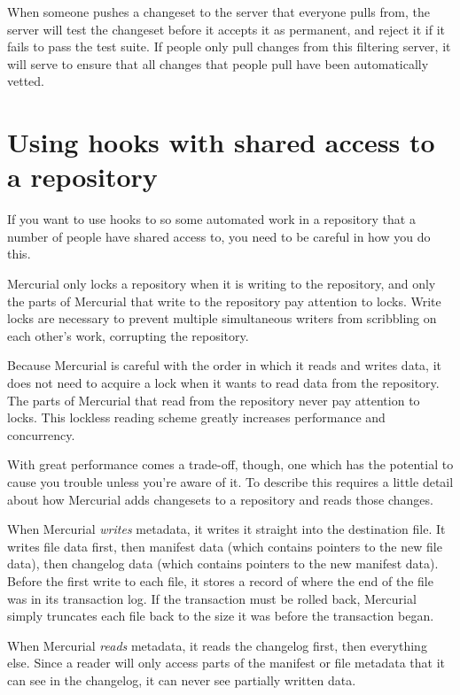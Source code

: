 When someone pushes a changeset to the server that everyone pulls
from, the server will test the changeset before it accepts it as
permanent, and reject it if it fails to pass the test suite.  If
people only pull changes from this filtering server, it will serve to
ensure that all changes that people pull have been automatically
vetted.

\section{Using hooks with shared access to a repository}

If you want to use hooks to so some automated work in a repository
that a number of people have shared access to, you need to be careful
in how you do this.

Mercurial only locks a repository when it is writing to the
repository, and only the parts of Mercurial that write to the
repository pay attention to locks.  Write locks are necessary to
prevent multiple simultaneous writers from scribbling on each other's
work, corrupting the repository.

Because Mercurial is careful with the order in which it reads and
writes data, it does not need to acquire a lock when it wants to read
data from the repository.  The parts of Mercurial that read from the
repository never pay attention to locks.  This lockless reading scheme
greatly increases performance and concurrency.

With great performance comes a trade-off, though, one which has the
potential to cause you trouble unless you're aware of it.  To describe
this requires a little detail about how Mercurial adds changesets to a
repository and reads those changes.

When Mercurial \emph{writes} metadata, it writes it straight into the
destination file.  It writes file data first, then manifest data
(which contains pointers to the new file data), then changelog data
(which contains pointers to the new manifest data).  Before the first
write to each file, it stores a record of where the end of the file
was in its transaction log.  If the transaction must be rolled back,
Mercurial simply truncates each file back to the size it was before the
transaction began.

When Mercurial \emph{reads} metadata, it reads the changelog first,
then everything else.  Since a reader will only access parts of the
manifest or file metadata that it can see in the changelog, it can
never see partially written data.

